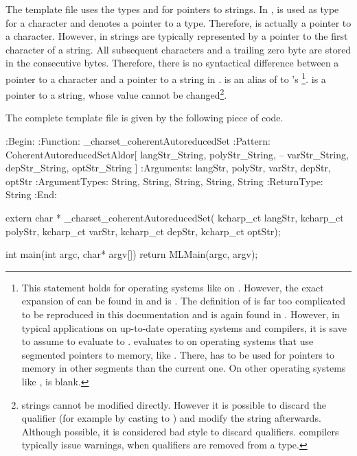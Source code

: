 The \MathLink template file uses the types  and  for pointers to strings. In \C,  is used as type for a character and \ccode{*} denotes a pointer to a type. Therefore,  is actually a pointer to a character. However, in \C strings are typically represented by a pointer to the first character of a string. All subsequent characters and a trailing zero byte are stored in the consecutive bytes. Therefore, there is no syntactical difference between a pointer to a character and a pointer to a string in \C.  is an alias of \MathLink to \C's \footnote{This statement holds for operating systems like \GNULinux on \xeightysix. However, the exact expansion of  can be found in  and is . The definition of  is far too complicated to be reproduced in this documentation and is again found in . However, in typical applications on up-to-date operating systems and \C compilers, it is save to assume  to evaluate to .  evaluates to  on operating systems that use segmented pointers to memory, like \MSDOS. There,  has to be used for pointers to memory in other segments than the current one. On other operating systems like \GNULinux,  is blank.}.  is a pointer to a string, whose value cannot be changed\footnote{ strings cannot be modified directly. However it is possible to discard the  qualifier (for example by casting to ) and modify the string afterwards. Although possible, it is considered bad style to discard qualifiers. \C compilers typically issue warnings, when qualifiers are removed from a type.}.

The complete \MathLink template file is given by the following piece of code.

\begin{mathematicaprogram}
:Begin:
:Function:      _charset_coherentAutoreducedSet
:Pattern:       CoherentAutoreducedSetAldor[ langStr_String, polyStr_String,      --
  varStr_String, depStr_String, optStr_String ]
:Arguments:     { langStr, polyStr, varStr, depStr, optStr }
:ArgumentTypes: { String, String, String, String, String }
:ReturnType:    String
:End:

extern char * _charset_coherentAutoreducedSet( kcharp_ct langStr, kcharp_ct polyStr, 
  kcharp_ct varStr, kcharp_ct depStr, kcharp_ct optStr);

int main(int argc, char* argv[])
{
  return MLMain(argc, argv);
}
\end{mathematicaprogram}

